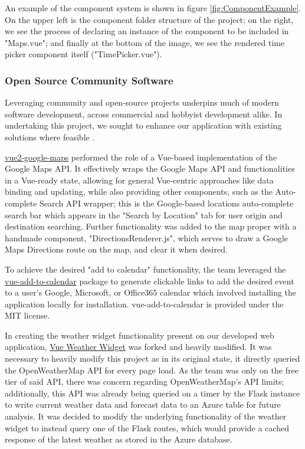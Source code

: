 \documentclass[]{UCD_CS_47360_Report}
\begin{document}
An example of the component system is shown in figure \ref{fig:ComponentExample}. On the upper left is the component folder structure of the project; on the right, we see the process of declaring an instance of the component to be included in "Maps.vue"; and finally at the bottom of the image, we see the rendered time picker component itself ("TimePicker.vue"). 

\subsubsection{Open Source Community Software}
Leveraging community and open-source projects underpins much of modern software development, across commercial and hobbyist development alike. In undertaking this project, we sought to enhance our application with existing solutions where feasible \cite{Optaros}.

\href{https://www.npmjs.com/package/vue2-google-maps}{vue2-google-maps} performed the role of a Vue-based implementation of the Google Maps API. It effectively wraps the Google Maps API and functionalities in a Vue-ready state, allowing for general Vue-centric approaches like data binding and updating, while also providing other components, such as the Auto-complete Search API wrapper; this is the Google-based locations auto-complete search bar which appears in the "Search by Location" tab for user origin and destination searching. Further functionality was added to the map proper with a handmade component, "DirectionsRenderer.js", which serves to draw a Google Maps Directions route on the map, and clear it when desired. %


To achieve the desired "add to calendar" functionality, the team leveraged the \href{https://www.npmjs.com/package/vue-add-to-calendar}{vue-add-to-calendar} package to generate clickable links to add the desired event to a user's Google, Microsoft, or Office365 calendar which involved installing the application locally for installation. vue-add-to-calendar is provided under the MIT license. 

In creating the weather widget functionality present on our developed web application, \href{https://github.com/dipu-bd/vue-weather-widget}{Vue Weather Widget} was forked and heavily modified. It was necessary to heavily modify this project as in its original state, it directly queried the OpenWeatherMap API for every page load. As the team was only on the free tier of said API, there was concern regarding OpenWeatherMap's API limits; additionally, this API was already being queried on a timer by the Flask instance to write current weather data and forecast data to an Azure table for future analysis. It was decided to modify the underlying functionality of the weather widget to instead query one of the Flask routes, which would provide a cached response of the latest weather as stored in the Azure database. 
\end{document}
